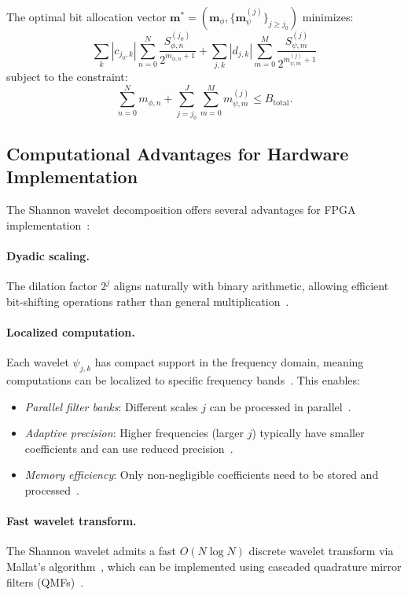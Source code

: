 The optimal bit allocation vector $\mathbf{m}^* = (\mathbf{m}_{\phi}, \{\mathbf{m}_{\psi}^{(j)}\}_{j \geq j_0})$ minimizes:
\begin{equation}
\sum_{k} |c_{j_0,k}| \sum_{n=0}^{N} \frac{S_{\phi,n}^{(j_0)}}{2^{m_{\phi,n}+1}} + \sum_{j,k} |d_{j,k}| \sum_{m=0}^{M} \frac{S_{\psi,m}^{(j)}}{2^{m_{\psi,m}^{(j)}+1}}
\label{eq:wavelet_bit_alloc_objective}
\end{equation}
subject to the constraint:
\begin{equation}
\sum_{n=0}^{N} m_{\phi,n} + \sum_{j=j_0}^{J} \sum_{m=0}^{M} m_{\psi,m}^{(j)} \leq B_{\text{total}}.
\label{eq:wavelet_bit_budget}
\end{equation}

\subsection{Computational Advantages for Hardware Implementation}

The Shannon wavelet decomposition offers several advantages for FPGA implementation~\cite{Andraka1998}:

\paragraph{Dyadic scaling.} The dilation factor $2^j$ aligns naturally with binary arithmetic, allowing efficient bit-shifting operations rather than general multiplication~\cite{ParkhiUnbehauen1974}.

\paragraph{Localized computation.} Each wavelet $\psi_{j,k}$ has compact support in the frequency domain, meaning computations can be localized to specific frequency bands~\cite{Mallat1989}. This enables:
\begin{itemize}
\item \emph{Parallel filter banks}: Different scales $j$ can be processed in parallel~\cite{VetterliKovacevic1995}.
\item \emph{Adaptive precision}: Higher frequencies (larger $j$) typically have smaller coefficients and can use reduced precision~\cite{Gustafsson2007}.
\item \emph{Memory efficiency}: Only non-negligible coefficients need to be stored and processed~\cite{Burrus1998}.
\end{itemize}

\paragraph{Fast wavelet transform.} The Shannon wavelet admits a fast $O(N \log N)$ discrete wavelet transform via Mallat's algorithm~\cite{Mallat1989}, which can be implemented using cascaded quadrature mirror filters (QMFs)~\cite{Vaidyanathan1993}.

